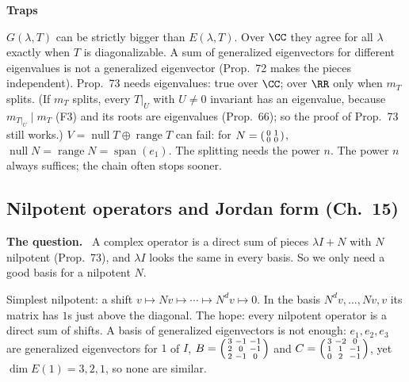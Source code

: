 \documentclass[10pt]{scrartcl}
\DeclareMathOperator{\nul}{null}
\DeclareMathOperator{\range}{range}
\DeclareMathOperator{\spn}{span}
\newenvironment{qbox}{\begin{mdframed}[style=qboxstyle]\textbf{The question.}\ }{\end{mdframed}}
\newenvironment{trapbox}{\begin{mdframed}[style=trapstyle]\textbf{\color{RawSienna}Traps}\begin{itemize}[itemsep=1pt,topsep=1pt]}{\end{itemize}\end{mdframed}}
\begin{document}
\begin{trapbox}
  \ii $G(\lambda,T)$ can be strictly bigger than $E(\lambda,T)$. Over $\CC$ they agree for all $\lambda$ exactly when $T$ is diagonalizable.
  \ii A sum of generalized eigenvectors for different eigenvalues is not a generalized eigenvector (Prop.~72 makes the pieces independent).
  \ii Prop.~73 needs eigenvalues: true over $\CC$; over $\RR$ only when $m_T$ splits. (If $m_T$ splits, every $T|_U$ with $U\ne0$ invariant has an eigenvalue, because $m_{T|_U}\mid m_T$ (F3) and its roots are eigenvalues (Prop.~66); so the proof of Prop.~73 still works.)
  \ii $V=\nul T\oplus\range T$ can fail: for $N=\begin{psmallmatrix}0&1\\0&0\end{psmallmatrix}$, $\nul N=\range N=\spn(e_1)$. The splitting needs the power $n$.
  \ii The power $n$ always suffices; the chain often stops sooner.
\end{trapbox}

\subsection{Nilpotent operators and Jordan form (Ch.~15)}

\begin{qbox}
  A complex operator is a direct sum of pieces $\lambda I+N$ with $N$ nilpotent (Prop.~73), and $\lambda I$ looks the same in every basis. So we only need a good basis for a nilpotent $N$.
  \begin{itemize}
    \ii Simplest nilpotent: a shift $v\mapsto Nv\mapsto\cdots\mapsto N^dv\mapsto0$. In the basis $N^dv,\dots,Nv,v$ its matrix has $1$s just above the diagonal.
    \ii The hope: every nilpotent operator is a direct sum of shifts.
    \ii A basis of generalized eigenvectors is not enough: $e_1,e_2,e_3$ are generalized eigenvectors for $1$ of $I$, $B=\begin{psmallmatrix}3&-1&-1\\2&0&-1\\2&-1&0\end{psmallmatrix}$ and $C=\begin{psmallmatrix}3&-2&0\\1&1&-1\\0&2&-1\end{psmallmatrix}$, yet $\dim E(1)=3,2,1$, so none are similar.
  \end{itemize}
\end{qbox}
\end{document}
